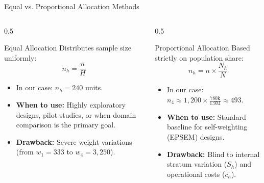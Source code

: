 \documentclass[10pt, aspectratio=169]{beamer}
\begin{document}
  \begin{frame}{Equal vs. Proportional Allocation Methods}
      \begin{columns}
          \begin{column}{0.5\textwidth}
              \begin{block}{Equal Allocation}
                  Distributes sample size uniformly:
                  $$n_h = \frac{n}{H}$$
                  \begin{itemize}
                      \item In our case: $n_h = 240$ units.
                      \item \textbf{When to use:} Highly exploratory designs, pilot studies, or when domain comparison is the primary goal.
                      \item \textbf{Drawback:} Severe weight variations (from $w_1 = 333$ to $w_4 = 3,250$).
                  \end{itemize}
              \end{block}
          \end{column}
          \begin{column}{0.5\textwidth}
              \begin{block}{Proportional Allocation}
                  Based strictly on population share:
                  $$n_h = n \times \frac{N_h}{N}$$
                  \begin{itemize}
                      \item In our case: $n_4 \approx 1,200 \times \frac{780\text{k}}{1.9\text{M}} \approx 493$.
                      \item \textbf{When to use:} Standard baseline for self-weighting (EPSEM) designs.
                      \item \textbf{Drawback:} Blind to internal stratum variation ($S_h$) and operational costs ($c_h$).
                  \end{itemize}
              \end{block}
          \end{column}
      \end{columns}
  \end{frame}
  
\end{document}
